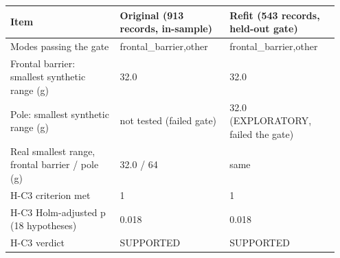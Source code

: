 {\scriptsize\raggedright
\begin{longtable}{p{0.317\linewidth}p{0.317\linewidth}p{0.317\linewidth}}
\toprule
Item & Original (913 records, in-sample) & Refit (543 records, held-out gate) \\
\midrule
\endhead
Modes passing the gate & frontal\_barrier,other & frontal\_barrier,other \\
Frontal barrier: smallest synthetic range (g) & 32.0 & 32.0 \\
Pole: smallest synthetic range (g) & not tested (failed gate) & 32.0 (EXPLORATORY, failed the gate) \\
Real smallest range, frontal barrier / pole (g) & 32.0 / 64 & same \\
H-C3 criterion met & 1 & 1 \\
H-C3 Holm-adjusted p (18 hypotheses) & 0.018 & 0.018 \\
H-C3 verdict & SUPPORTED & SUPPORTED \\
\bottomrule
\end{longtable}}


